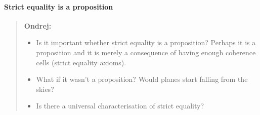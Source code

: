 \documentclass[a4paper]{article}
\newcommand{\id}{\mathsf{id}}
\newenvironment{ondrej}{\begin{quote}\footnotesize \textbf{Ondrej:}}{\normalsize\end{quote}}
\begin{document}
\paragraph{Strict equality is a proposition}
\begin{ondrej}
\begin{itemize}
\item Is it important whether strict equality is a proposition?
  Perhaps it is a proposition and it is merely a consequence of having
  enough coherence cells (strict equality axioms).
\item What if it wasn't a proposition? Would planes start falling from
  the skies? 
\item Is there a universal characterisation of strict equality?
\end{itemize}
\end{ondrej}




\end{document}
